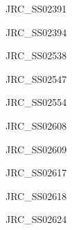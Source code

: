 \documentclass[17pt]{extarticle}
\begin{document}
\newpage\vspace*{-0.15cm}
\begin{large}
JRC\_SS02391 \\[0.5em]
\end{large}

\newpage\vspace*{-0.15cm}
\begin{large}
JRC\_SS02394 \\[0.5em]
\end{large}

\newpage\vspace*{-0.15cm}
\begin{large}
JRC\_SS02538 \\[0.5em]
\end{large}

\newpage\vspace*{-0.15cm}
\begin{large}
JRC\_SS02547 \\[0.5em]
\end{large}

\newpage\vspace*{-0.15cm}
\begin{large}
JRC\_SS02554 \\[0.5em]
\end{large}

\newpage\vspace*{-0.15cm}
\begin{large}
JRC\_SS02608 \\[0.5em]
\end{large}

\newpage\vspace*{-0.15cm}
\begin{large}
JRC\_SS02609 \\[0.5em]
\end{large}

\newpage\vspace*{-0.15cm}
\begin{large}
JRC\_SS02617 \\[0.5em]
\end{large}

\newpage\vspace*{-0.15cm}
\begin{large}
JRC\_SS02618 \\[0.5em]
\end{large}

\newpage\vspace*{-0.15cm}
\begin{large}
JRC\_SS02624 \\[0.5em]
\end{large}
\end{document}
